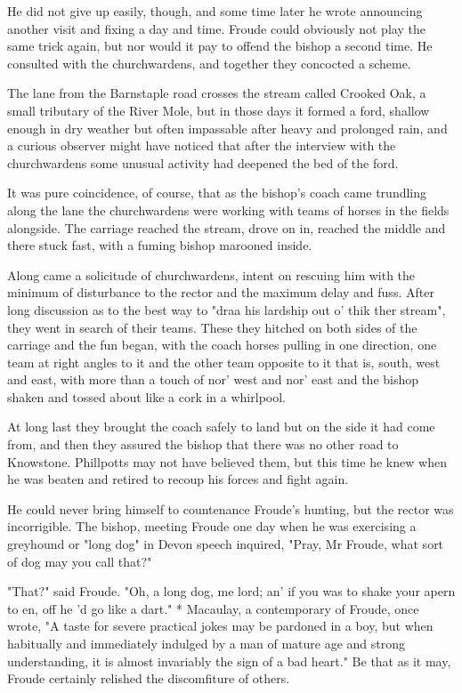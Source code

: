 \Flourish 

He did not give up easily, though, and some time later he wrote announcing another visit and fixing a day and time. Froude could obviously not play the same trick again, but nor would it pay to offend the bishop a second time. He consulted with the churchwardens, and together they concocted a scheme.

The lane from the Barnstaple road crosses the stream called Crooked Oak, a small tributary of the River Mole, but in those days it formed a ford, shallow enough in dry weather but often impassable after heavy and prolonged rain, and a curious observer might have noticed that after the interview with the churchwardens some unusual activity had deepened the bed of the ford.

It was pure coincidence, of course, that as the bishop's coach came trundling along the lane the churchwardens were working with teams of horses in the fields alongside. The carriage reached the stream, drove on in, reached the middle and there stuck fast, with a fuming bishop marooned inside.

Along came a solicitude of churchwardens, intent on rescuing him with the minimum of disturbance to the rector and the maximum delay and fuss. After long discussion as to the best way to "draa his lardship out o' thik ther stream", they went in search of their teams. These they hitched on both sides of the carriage and the fun began, with the coach horses pulling in one direction, one team at right angles to it and the other team opposite to it   that is, south, west and east, with more than a touch of nor' west and nor' east   and the bishop shaken and tossed about like a cork in a whirlpool.

At long last they brought the coach safely to land   but on the side it had come from, and then they assured the bishop that there was no other road to Knowstone. Phillpotts may not have believed them, but this time he knew when he was beaten and retired to recoup his forces and fight again. 

He could never bring himself to countenance Froude's hunting, but the rector was incorrigible. The bishop, meeting Froude one day when he was exercising a greyhound   or "long dog" in Devon speech   inquired, "Pray, Mr Froude, what sort of dog may you call that?"

"That?" said Froude. "Oh, a long dog, me lord; an' if you was to shake your apern to en, off he 'd go like a dart."
 			* 
Macaulay, a contemporary of Froude, once wrote, "A taste for severe practical jokes may be pardoned in a boy, but when habitually and immediately indulged by a man of mature age and strong understanding, it is almost invariably the sign of a bad heart." Be that as it may, Froude certainly relished the discomfiture of others.

